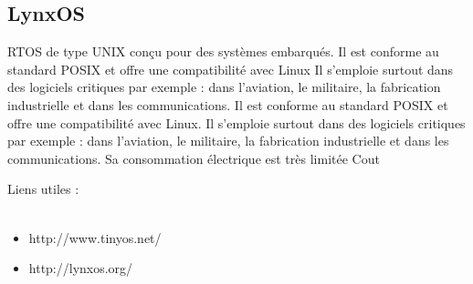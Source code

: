 		\subsection{LynxOS}
		 
{RTOS de type UNIX conçu pour des systèmes embarqués. Il est conforme au standard POSIX et offre une compatibilité avec Linux}
{Il s'emploie surtout dans des logiciels critiques par exemple : dans l'aviation, le militaire, la fabrication industrielle et dans les communications.
Il est conforme au standard POSIX et offre une compatibilité avec Linux. Il s'emploie surtout dans des logiciels critiques par exemple : dans l'aviation, le militaire, la fabrication industrielle et dans les communications.}
{Sa consommation électrique est très limitée}
{Cout}
{}
{}


Liens utiles : \\~
\begin {itemize}
	\item http://www.tinyos.net/
	\item http://lynxos.org/
\end {itemize}

